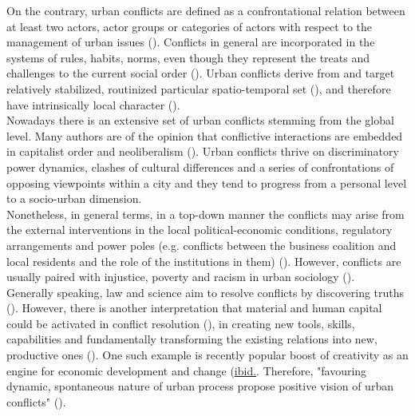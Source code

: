 \documentclass[11pt]{report}
\begin{document}
On the contrary, urban conflicts are defined as a confrontational relation between at least two actors, actor groups or categories of actors with respect to the management of urban issues (\cite{Nel'lo 2003, Aznar et al. 2006. from Renau and Lozano 2016 TerrPolGovern journal}).
Conflicts in general are incorporated in the systems of rules, habits, norms, even though they represent the treats and challenges to the current social order (\cite{Sears and Cairn}).
Urban conflicts derive from and target relatively stabilized, routinized particular spatio-temporal set (\citealt{Brenner and Theodore; Lipietz 1996}), and therefore have intrinsically local character (\href{Sassen}{\citealt{sassen_toward_2007}}).
\\

Nowadays there is an extensive set of urban conflicts stemming from the global level.
Many authors are of the opinion that conflictive interactions are embedded in capitalist order and neoliberalism (\cite{ref Brenner and Theodore, Harvey, conflict authors}).
Urban conflicts thrive on discriminatory power dynamics, clashes of cultural differences and a series of confrontations of opposing viewpoints within a city and they tend to progress from a personal level to a socio-urban dimension.
\\

Nonetheless, in general terms, in a top-down manner the conflicts may arise from the external interventions in the local political-economic conditions, regulatory arrangements and power poles (e.g. conflicts between the business coalition and local residents and the role of the institutions in them) (\cite{Brenner and Theodore}).
However, conflicts are usually paired with injustice, poverty and racism in urban sociology (\cite{Hubbard}).
\\

Generally speaking, law and science aim to resolve conflicts by discovering truths (\cite{Brenner and Theodore}).
However, there is another interpretation that material and human capital could be activated in conflict resolution (\href{Coleman}{\citealt{coleman_social_1988}}), in creating new tools, skills, capabilities and fundamentally transforming the existing relations into new, productive ones (\citealt{Sears 2008}). One such example is recently popular boost of creativity as an engine for economic development and change (\href{Sears}{ibid.}.
Therefore, "favouring dynamic, spontaneous nature of urban process propose positive vision of urban conflicts" 
(\href{Sevilla-Buitrago}{\citealt{evilla-buitrago_debating_2013}}).
\end{document}
